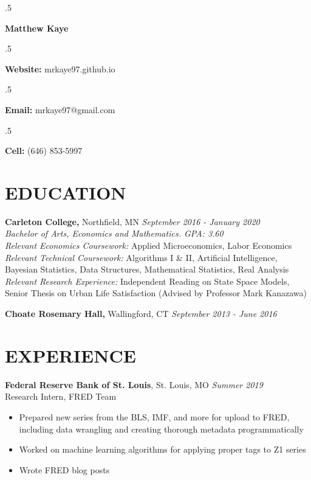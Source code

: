 \documentclass[margin, 10pt]{res} %
\begin{document}
\singlespacing

\moveleft.5\hoffset\centerline{\LARGE\bf Matthew Kaye} %
\medskip
\moveleft.5\hoffset\centerline{\textbf{Website:} mrkaye97.github.io}
\moveleft.5\hoffset\centerline{\textbf{Email:} mrkaye97@gmail.com}
\moveleft.5\hoffset\centerline{\textbf{Cell:} (646) 853-5997}


\begin{resume}


\section{EDUCATION}

{\sl} \textbf{Carleton College,} Northfield, MN \hfill \textit{September 2016 - January 2020}\smallskip\\
{\sl Bachelor of Arts, Economics and Mathematics. GPA: 3.60} \smallskip\\
{\sl Relevant Economics Coursework: } Applied Microeconomics, Labor Economics \smallskip\\
{\sl Relevant Technical Coursework: } Algorithms I \& II, Artificial Intelligence, Bayesian Statistics, Data Structures, Mathematical Statistics, Real Analysis \smallskip\\
{\sl Relevant Research Experience: } Independent Reading on State Space Models, Senior Thesis on Urban Life Satisfaction (Advised by Professor Mark Kanazawa)

{\sl} \textbf{Choate Rosemary Hall,} Wallingford, CT \hfill \textit{September 2013 - June 2016}

\section{EXPERIENCE}
{\sl} \textbf{Federal Reserve Bank of St. Louis}, St. Louis, MO \hfill \textit{Summer 2019}\smallskip\\
{\sl} Research Intern, FRED Team \smallskip
{\sl} \begin{itemize}
	\item Prepared new series from the BLS, IMF, and more for upload to FRED, including data wrangling and creating thorough metadata programmatically
	\item Worked on machine learning algorithms for applying proper tags to Z1 series
	\item Wrote FRED blog posts
\end{itemize}


\end{resume}
\end{document}
